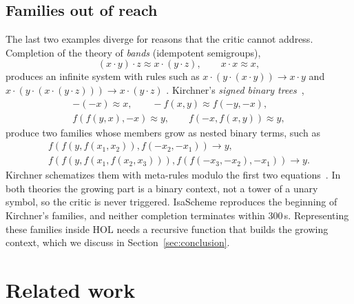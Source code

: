 \documentclass[preprint,12pt]{elsarticle}
\newcommand{\rw}{\to}
\begin{document}
\subsection{Families out of reach}

The last two examples diverge for reasons that the critic cannot address.
Completion of the theory of \emph{bands} (idempotent semigroups),
\[
  (x \cdot y) \cdot z \approx x \cdot (y \cdot z), \qquad x \cdot x \approx x,
\]
produces an infinite system with rules such as
$x \cdot (y \cdot (x \cdot y)) \rw x \cdot y$ and
$x \cdot (y \cdot (x \cdot (y \cdot z))) \rw x \cdot (y \cdot z)$
\cite[Section~2.4]{Dershowitz89}. Kirchner's \emph{signed binary
trees}~\cite[Example~2.1]{Kirchner89},
\begin{gather*}
  -(-x) \approx x,\qquad -f(x,y) \approx f(-y,-x),\\
  f(f(y,x),-x) \approx y,\qquad f(-x,f(x,y)) \approx y,
\end{gather*}
produce two families whose members grow as nested binary terms, such as
\begin{gather*}
  f(f(y,f(x_1,x_2)),f(-x_2,-x_1)) \rw y, \\
  f(f(y,f(x_1,f(x_2,x_3))),f(f(-x_3,-x_2),-x_1)) \rw y.
\end{gather*}
Kirchner schematizes them with meta-rules modulo the first two
equations~\cite{Kirchner89,BurghardtHeinz96}. In both theories the growing
part is a binary context, not a tower of a unary symbol, so the critic is
never triggered. IsaScheme reproduces the beginning of Kirchner's families,
and neither completion terminates within 300\,s. Representing these
families inside HOL needs a recursive function that builds the growing
context, which we discuss in Section~\ref{sec:conclusion}.

\section{Related work}
\label{sec:related}
\end{document}
